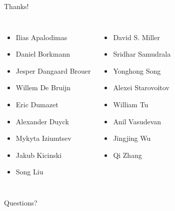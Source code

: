 \documentclass{beamer}
\begin{document}
  \begin{frame}{Thanks!}
  \begin{columns}[T,onlytextwidth]
    \begin{itemize}
    \item Ilias Apalodimas
    \item Daniel Borkmann
    \item Jesper Dangaard Brouer
    \item Willem De Bruijn
    \item Eric Dumazet
    \item Alexander Duyck
    \item Mykyta Iziumtsev
    \item Jakub Kicinski
    \item Song Liu
    \end{itemize}
    
    \begin{itemize}
    \item David S. Miller
    \item Sridhar Samudrala
    \item Yonghong Song
    \item Alexei Starovoitov
    \item William Tu
    \item Anil Vasudevan
    \item Jingjing Wu
    \item Qi Zhang
    \end{itemize}
  \end{columns}
  \end{frame}

  \begin{frame}[standout]
    Questions?
  \end{frame}
\end{document}
